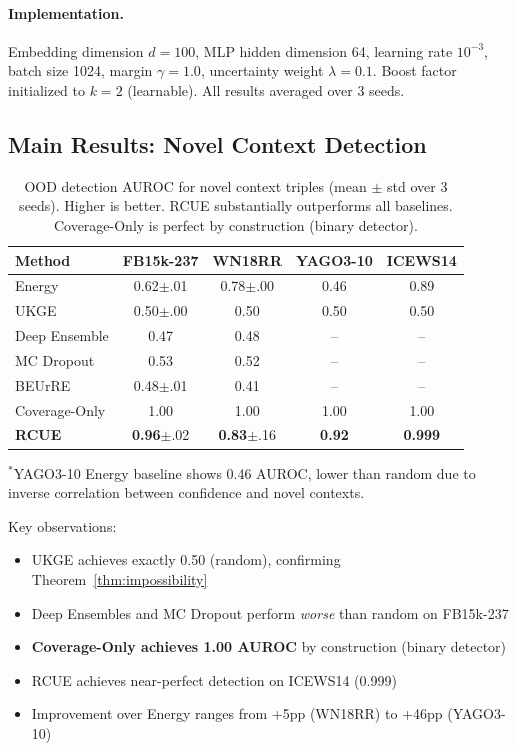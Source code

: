 \paragraph{Implementation.}
Embedding dimension $d = 100$, MLP hidden dimension 64, learning rate $10^{-3}$, batch size 1024, margin $\gamma = 1.0$, uncertainty weight $\lambda = 0.1$. Boost factor initialized to $k = 2$ (learnable). All results averaged over 3 seeds.

\subsection{Main Results: Novel Context Detection}

\begin{table}[h]
\centering
\caption{OOD detection AUROC for novel context triples (mean $\pm$ std over 3 seeds). Higher is better. RCUE substantially outperforms all baselines. Coverage-Only is perfect by construction (binary detector).}
\label{tab:main}
\begin{tabular}{lcccc}
\toprule
Method & FB15k-237 & WN18RR & YAGO3-10 & ICEWS14 \\
\midrule
Energy & 0.62{\tiny $\pm$.01} & 0.78{\tiny $\pm$.00} & 0.46 & 0.89 \\
UKGE & 0.50{\tiny $\pm$.00} & 0.50 & 0.50 & 0.50 \\
Deep Ensemble & 0.47 & 0.48 & -- & -- \\
MC Dropout & 0.53 & 0.52 & -- & -- \\
BEUrRE & 0.48{\tiny $\pm$.01} & 0.41 & -- & -- \\
Coverage-Only & 1.00 & 1.00 & 1.00 & 1.00 \\
\midrule
\textbf{RCUE} & \textbf{0.96}{\tiny $\pm$.02} & \textbf{0.83}{\tiny $\pm$.16} & \textbf{0.92} & \textbf{0.999} \\
\bottomrule
\end{tabular}
\end{table}

$^*$YAGO3-10 Energy baseline shows 0.46 AUROC, lower than random due to inverse correlation between confidence and novel contexts.

Key observations:
\begin{itemize}
    \item UKGE achieves exactly 0.50 (random), confirming Theorem~\ref{thm:impossibility}
    \item Deep Ensembles and MC Dropout perform \emph{worse} than random on FB15k-237
    \item \textbf{Coverage-Only achieves 1.00 AUROC} by construction (binary detector)
    \item RCUE achieves near-perfect detection on ICEWS14 (0.999)
    \item Improvement over Energy ranges from +5pp (WN18RR) to +46pp (YAGO3-10)
\end{itemize}

